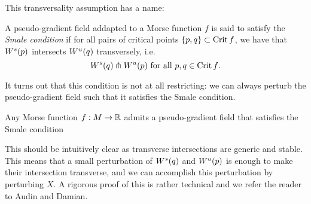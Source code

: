     This transversality assumption has a name:
    \begin{definition}
        A pseudo-gradient field addapted to a Morse function $f$ is said to satisfy the \emph{Smale condition} if for all pairs of critical points $ \{p, q\}  \subset \operatorname{Crit} f$, we have that $W^s(p)$ intersects  $W^u(q)$ transversely, i.e. 
        \[
            W^s(q) \pitchfork  W^u(p) \text{ for all $p, q \in \operatorname{Crit} f$}
        .\] 
    \end{definition}
    It turns out that this condition is not at all restricting: we can always perturb the pseudo-gradient field such that it satisfies the Smale condition.
    \begin{theorem}
        Any Morse function $f:M \to  \mathbb{R}$ admits a pseudo-gradient field that satisfies the Smale condition
    \end{theorem}
    This should be intuitively clear as transverse intersections are generic and stable.
    This means that a small perturbation of $W^s(q)$ and  $W^u(p)$ is enough to make their intersection transverse, and we can accomplish this perturbation by perturbing $X$.
    A rigorous proof of this is rather technical and we refer the reader to Audin and Damian.

